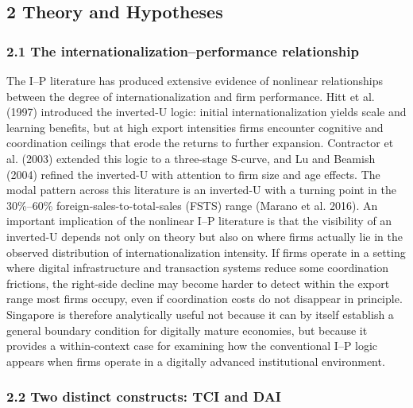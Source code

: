 \documentclass[12pt,a4paper]{article}
\begin{document}
\hypertarget{2-theory-and-hypotheses}{%
\subsection{2 Theory and Hypotheses}\label{2-theory-and-hypotheses}}

\hypertarget{21-the-internationalizationperformance-relationship}{%
\subsubsection{2.1 The internationalization--performance
relationship}\label{21-the-internationalizationperformance-relationship}}

The I--P literature has produced extensive evidence of nonlinear
relationships between the degree of internationalization and firm
performance. Hitt et al. (1997) introduced the inverted-U logic: initial
internationalization yields scale and learning benefits, but at high
export intensities firms encounter cognitive and coordination ceilings
that erode the returns to further expansion. Contractor et al. (2003)
extended this logic to a three-stage S-curve, and Lu and Beamish (2004)
refined the inverted-U with attention to firm size and age effects. The
modal pattern across this literature is an inverted-U with a turning
point in the 30\%--60\% foreign-sales-to-total-sales (FSTS) range
(Marano et al. 2016). An important implication of the nonlinear I--P
literature is that the visibility of an inverted-U depends not only on
theory but also on where firms actually lie in the observed distribution
of internationalization intensity. If firms operate in a setting where
digital infrastructure and transaction systems reduce some coordination
frictions, the right-side decline may become harder to detect within the
export range most firms occupy, even if coordination costs do not
disappear in principle. Singapore is therefore analytically useful not
because it can by itself establish a general boundary condition for
digitally mature economies, but because it provides a within-context
case for examining how the conventional I--P logic appears when firms
operate in a digitally advanced institutional environment.

\hypertarget{22-two-distinct-constructs-tci-and-dai}{%
\subsubsection{2.2 Two distinct constructs: TCI and
DAI}\label{22-two-distinct-constructs-tci-and-dai}}
\end{document}
